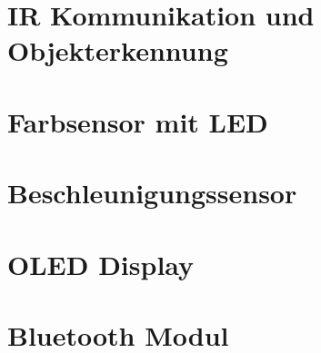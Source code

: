 \documentclass[a4paper,10pt,fleqn]{article}
\begin{document}
\section{IR Kommunikation und Objekterkennung}

\section{Farbsensor mit LED}

\section{Beschleunigungssensor}

\section{OLED Display}

\section{Bluetooth Modul}
\end{document}
